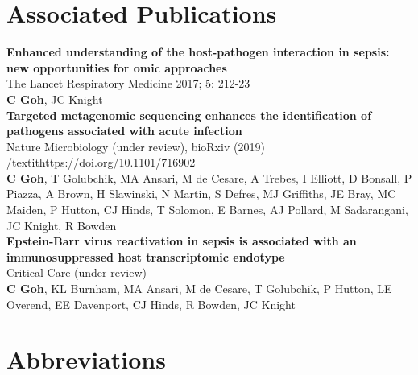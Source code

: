 \newpage
\chapter*{Associated Publications}
\thispagestyle{plain}

\noindent
\textbf{Enhanced understanding of the host-pathogen interaction in sepsis: new opportunities for omic approaches}\\
The Lancet Respiratory Medicine 2017; 5: 212-23\\
\textbf{C Goh}, JC Knight\\

\textbf{Targeted metagenomic sequencing enhances the identification of pathogens associated with acute infection}\\
Nature Microbiology (under review), bioRxiv (2019) /textit{https://doi.org/10.1101/716902}\\
\textbf{C Goh}, T Golubchik, MA Ansari, M de Cesare, A Trebes, I Elliott, D Bonsall, P Piazza, A Brown, H Slawinski, N Martin, S Defres, MJ Griffiths, JE Bray, MC Maiden, P Hutton, CJ Hinds, T Solomon, E Barnes, AJ Pollard, M Sadarangani, JC Knight, R Bowden\\

\textbf{Epstein-Barr virus reactivation in sepsis is associated with an immunosuppressed host transcriptomic endotype}\\
Critical Care (under review)\\
\textbf{C Goh}, KL Burnham, MA Ansari, M de Cesare, T Golubchik, P Hutton, LE Overend, EE Davenport, CJ Hinds, R Bowden, JC Knight\\


\newpage
{}
\tableofcontents

\newpage
\listoffigures
{}

\newpage
\listoftables
{}

\chapter*{Abbreviations}

